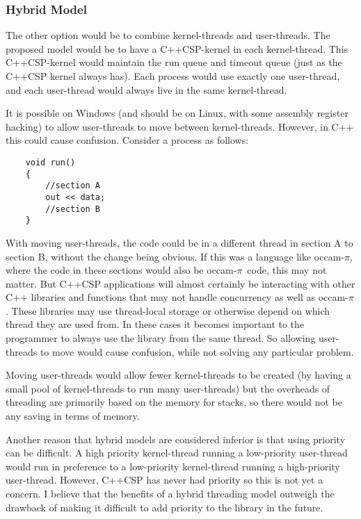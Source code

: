 \documentclass[12pt]{IOS-Book-Article-CPA-2007}
\newcommand{\occampi}{occam-$\pi$}
\begin{document}
\subsubsection{Hybrid Model}

\label{moving-threads}

The other option would be to combine kernel-threads and user-threads.  The proposed model would be to have a C++CSP-kernel in each kernel-thread.  This
C++CSP-kernel would maintain the run queue and timeout queue (just as the C++CSP kernel always has).  Each process would use exactly one user-thread,
and each user-thread would always live in the same kernel-thread.

It is possible on Windows (and should be on Linux, with some assembly register hacking) to allow user-threads to move between kernel-threads.  However, in C++ this could cause
confusion.  Consider a process as follows:

{\small\begin{verbatim}
    void run()
    {
        //section A
        out << data;
        //section B
    }
\end{verbatim}}

With moving user-threads, the code could be in a different thread in section A to section B, without the change being obvious.  If this was a 
language like \occampi, where the code in these sections would also be \occampi~code, this may not matter.  But C++CSP applications will almost 
certainly be interacting with other C++ libraries and functions that may not handle concurrency as well as \occampi.  These
libraries may use thread-local storage or otherwise depend on which thread they are used from.  In these cases it becomes important to the programmer 
to always use the library from the same thread.  So allowing user-threads to move would cause confusion, while not solving any particular problem.  

Moving user-threads would allow fewer kernel-threads to be created (by having a small pool of kernel-threads to run many user-threads) but the overheads 
of threading are primarily based on the memory for stacks, so there would not be any saving in terms of memory.

Another reason that hybrid models are considered inferior is that using priority can be difficult.  A high priority kernel-thread running a low-priority user-thread
would run in preference to a low-priority kernel-thread running a high-priority user-thread.  However, C++CSP has never had priority so this is not
yet a concern.  I believe that the benefits of a hybrid threading model outweigh the drawback of making it difficult to add priority to the library in the future.
\end{document}
